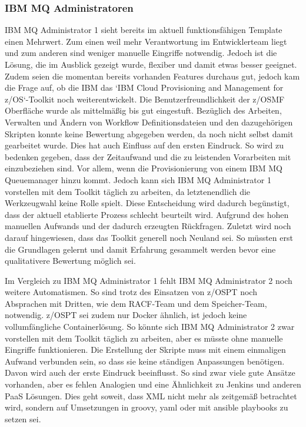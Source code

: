 \subsubsection{IBM MQ Administratoren}
IBM MQ Administrator 1 sieht bereits im aktuell funktionsfähigen Template einen Mehrwert.
Zum einen weil mehr Verantwortung im Entwicklerteam liegt und zum anderen sind weniger manuelle Eingriffe notwendig.
Jedoch ist die Lösung, die im Ausblick gezeigt wurde, flexiber und damit etwas besser geeignet.
Zudem seien die momentan bereits vorhanden Features durchaus gut, jedoch kam die Frage auf, ob die IBM das `IBM Cloud Provisioning and Management for z/OS`-Toolkit noch weiterentwickelt.
Die Benutzerfreundlichkeit der z/OSMF Oberfläche wurde als mittelmäßig bis gut eingestuft.
Bezüglich des Arbeiten, Verwalten und Ändern von Workflow Definitionsdateien und den dazugehörigen Skripten konnte keine Bewertung abgegeben werden, da noch nicht selbst damit gearbeitet wurde.
Dies hat auch Einfluss auf den ersten Eindruck.
So wird zu bedenken gegeben, dass der Zeitaufwand und die zu leistenden Vorarbeiten mit einzubeziehen sind.
Vor allem, wenn die Provisionierung von einem IBM MQ Queuemanager hinzu kommt.
Jedoch kann sich IBM MQ Administrator 1 vorstellen mit dem Toolkit täglich zu arbeiten, da letztenendlich die Werkzeugwahl keine Rolle spielt.
Diese Entscheidung wird dadurch begünstigt, dass der aktuell etablierte Prozess schlecht beurteilt wird.
Aufgrund des hohen manuellen Aufwands und der dadurch erzeugten Rückfragen.
Zuletzt wird noch darauf hingewiesen, dass das Toolkit generell noch Neuland sei.
So müssten erst die Grundlagen gelernt und damit Erfahrung gesammelt werden bevor eine qualitativere Bewertung möglich sei.

Im Vergleich zu IBM MQ Administrator 1 fehlt IBM MQ Administrator 2 noch weitere Automatismen.
So sind trotz des Einsatzen von z/OSPT noch Absprachen mit Dritten, wie dem RACF-Team und dem Speicher-Team, notwendig.
z/OSPT sei zudem nur Docker ähnlich, ist jedoch keine vollumfängliche Containerlösung.
So könnte sich IBM MQ Administrator 2 zwar vorstellen mit dem Toolkit täglich zu arbeiten, aber es müsste ohne manuelle Eingriffe funktionieren.
Die Erstellung der Skripte muss mit einem einmaligen Aufwand verbunden sein, so dass sie keine ständigen Anpassungen benötigen.
Davon wird auch der erste Eindruck beeinflusst.
So sind zwar viele gute Ansätze vorhanden, aber es fehlen Analogien und eine Ähnlichkeit zu Jenkins und anderen PaaS Lösungen.
Dies geht soweit, dass XML nicht mehr als zeitgemäß betrachtet wird, sondern auf Umsetzungen in groovy, yaml oder mit ansible playbooks zu setzen sei.

